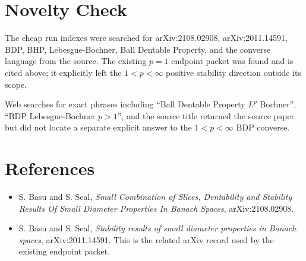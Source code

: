 \documentclass[11pt]{article}
\begin{document}
\section{Novelty Check}

The cheap run indexes were searched for arXiv:2108.02908, arXiv:2011.14591, BDP, BHP, Lebesgue-Bochner, Ball Dentable Property, and the converse language from the source.  The existing \(p=1\) endpoint packet was found and is cited above; it explicitly left the \(1<p<\infty\) positive stability direction outside its scope.

Web searches for exact phrases including ``Ball Dentable Property \(L^p\) Bochner'', ``BDP Lebesgue-Bochner \(p>1\)'', and the source title returned the source paper but did not locate a separate explicit answer to the \(1<p<\infty\) BDP converse.

\section{References}

\begin{itemize}
\item S. Basu and S. Seal, \emph{Small Combination of Slices, Dentability and Stability Results Of Small Diameter Properties In Banach Spaces}, arXiv:2108.02908.
\item S. Basu and S. Seal, \emph{Stability results of small diameter properties in Banach spaces}, arXiv:2011.14591.  This is the related arXiv record used by the existing endpoint packet.
\end{itemize}
\end{document}
